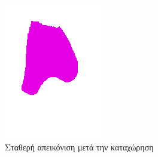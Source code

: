 \documentclass[a4paper,12pt]{article}
\begin{document}
\begin{figure}[H]
    \centering

    \begin{subfigure}[t]{0.4\linewidth}
    \includegraphics[width=\linewidth]{original_label_registration_3.png}
    \caption{Σταθερή απεικόνιση μετά την καταχώρηση}
    \end{subfigure}
    \begin{subfigure}[t]{0.4\linewidth}

\end{subfigure}
\end{figure}
\end{document}
